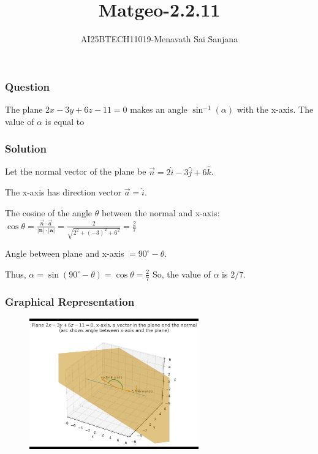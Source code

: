 \documentclass{beamer}
\title{Matgeo-2.2.11}
\author{AI25BTECH11019-Menavath Sai Sanjana}
\date{}
\theoremstyle{remark}
\let\vec\mathbf
\begin{document}
\begin{frame}
\titlepage
\end{frame}

\begin{frame}
\frametitle{Question}
The plane $2x - 3y + 6z - 11 = 0$ makes an angle $\sin^{-1}(\alpha)$ with the x-axis. The value of $\alpha$ is equal to
\end{frame}

%

\begin{frame}
\frametitle{Solution}

Let the normal vector of the plane be $\overrightarrow{n} = 2\hat{i} - 3\hat{j} + 6\hat{k}$.

The x-axis has direction vector $\overrightarrow{a} = \hat{i}$.

The cosine of the angle $\theta$ between the normal and x-axis:
$
\cos\theta = \frac{\overrightarrow{n} \cdot \overrightarrow{a}}{|\vec{n}| \cdot |\vec{a}|}
= \frac{2}{\sqrt{2^2 + (-3)^2 + 6^2}} = \frac{2}{7}
$

Angle between plane and x-axis $= 90^\circ - \theta$.

Thus,
$
\alpha = \sin(90^\circ - \theta) = \cos\theta = \frac{2}{7}
$
So, the value of $\alpha$ is $2/7$.

\end{frame}

\begin{frame}
\frametitle{Graphical Representation}

\begin{figure}[ht!]
    \centering
    \includegraphics[width=0.65\textwidth]{matgeo-2.2.11.jpeg}
    \caption{}
    \label{fig:1.2.27.jpg}
\end{figure}
\end{frame}
\end{document}
